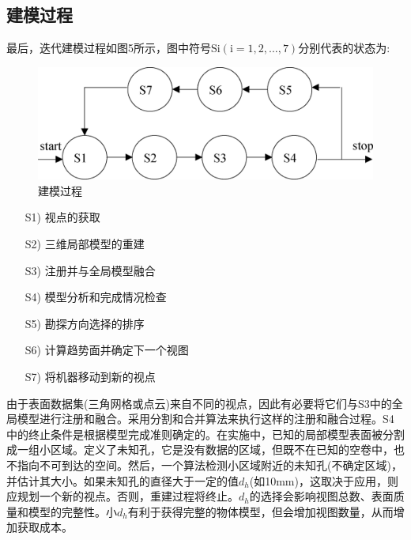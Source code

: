 \documentclass[AutoFakeBold,zihao=-4]{ctexart}
\begin{document}
	\subsection{建模过程}
	
	最后，迭代建模过程如图5所示，图中符号$ \mathrm{Si}(\mathrm{i}=1,2, \ldots, 7) $分别代表的状态为:
	\begin{figure}[h]
		\centering
		\includegraphics[scale=0.15]{PIC5}
		\caption{建模过程}
		\label{fig-Modeling-process}
	\end{figure}
	\begin{enumerate}
		\item[S1)] 视点的获取
		\item[S2)] 三维局部模型的重建
		\item[S3)] 注册并与全局模型融合
		\item[S4)] 模型分析和完成情况检查
		\item[S5)] 勘探方向选择的排序
		\item[S6)] 计算趋势面并确定下一个视图
		\item[S7)] 将机器移动到新的视点
	\end{enumerate}
	由于表面数据集(三角网格或点云)来自不同的视点，因此有必要将它们与S3中的全局模型进行注册和融合。采用分割和合并算法来执行这样的注册和融合过程。S4中的终止条件是根据模型完成准则确定的。在实施中，已知的局部模型表面被分割成一组小区域。定义了未知孔，它是没有数据的区域，但既不在已知的空卷中，也不指向不可到达的空间。然后，一个算法检测小区域附近的未知孔(不确定区域)，并估计其大小。如果未知孔的直径大于一定的值$ d_{h} $(如10mm)，这取决于应用，则应规划一个新的视点。否则，重建过程将终止。$ d_{h} $的选择会影响视图总数、表面质量和模型的完整性。小$ d_{h} $有利于获得完整的物体模型，但会增加视图数量，从而增加获取成本。
	
\end{document}
